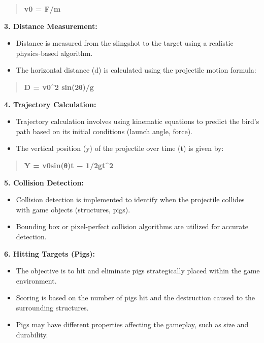 \documentclass[
]{article}
\begin{document}
\begin{quote}
\textbf{v0\hspace{0pt} = F/m}
\end{quote}

\textbf{3. Distance Measurement:}

\begin{itemize}
\item
  Distance is measured from the slingshot to the target using a
  realistic physics-based algorithm.
\item
  The horizontal distance (d) is calculated using the projectile motion
  formula:
\end{itemize}

\begin{quote}
\textbf{D = v0\^{}2 \hspace{0pt}sin(2θ)\hspace{0pt}/g}
\end{quote}

\textbf{4. Trajectory Calculation:}

\begin{itemize}
\item
  Trajectory calculation involves using kinematic equations to predict
  the bird's path based on its initial conditions (launch angle, force).
\item
  The vertical position (y) of the projectile over time (t) is given by:
\end{itemize}

\begin{quote}
\textbf{Y = v0\hspace{0pt}sin(θ)t − 1/2\hspace{0pt}gt\^{}2}
\end{quote}

\textbf{5. Collision Detection:}

\begin{itemize}
\item
  Collision detection is implemented to identify when the projectile
  collides with game objects (structures, pigs).
\item
  Bounding box or pixel-perfect collision algorithms are utilized for
  accurate detection.
\end{itemize}

\textbf{6. Hitting Targets (Pigs):}

\begin{itemize}
\item
  The objective is to hit and eliminate pigs strategically placed within
  the game environment.
\item
  Scoring is based on the number of pigs hit and the destruction caused
  to the surrounding structures.
\item
  Pigs may have different properties affecting the gameplay, such as
  size and durability.
\end{itemize}
\end{document}
